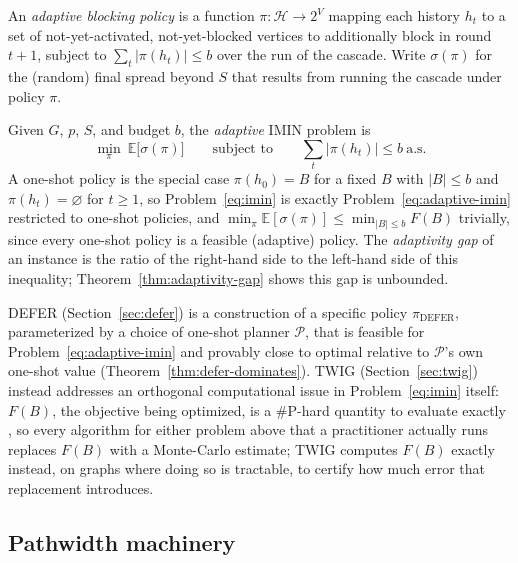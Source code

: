 \documentclass[ASNA,number]{USG}
\newcommand{\FF}{F}
\begin{document}
\begin{definition}\label{def:policy}
An \emph{adaptive blocking policy} is a function
$\pi:\mathcal H\to 2^V$ mapping each history $h_t$ to a set of
not-yet-activated, not-yet-blocked vertices to additionally block in round
$t+1$, subject to $\sum_{t}|\pi(h_t)|\le b$ over the run of the cascade.
Write $\sigma(\pi)$ for the (random) final spread beyond $S$ that results
from running the cascade under policy $\pi$.
\end{definition}

\begin{definition}\label{def:adaptive-imin}
Given $G$, $p$, $S$, and budget $b$, the \emph{adaptive} IMIN problem is
\begin{equation}\label{eq:adaptive-imin}
\min_{\pi}\ \mathbb E\bigl[\sigma(\pi)\bigr]
\qquad\text{subject to}\qquad
\textstyle\sum_t|\pi(h_t)|\le b\ \text{a.s.}
\end{equation}
A one-shot policy is the special case $\pi(h_0)=B$ for a fixed
$B$ with $|B|\le b$ and $\pi(h_t)=\varnothing$ for $t\ge1$, so
Problem~\eqref{eq:imin} is exactly Problem~\eqref{eq:adaptive-imin}
restricted to one-shot policies, and
$\min_\pi\mathbb E[\sigma(\pi)]\le\min_{|B|\le b}\FF(B)$ trivially, since
every one-shot policy is a feasible (adaptive) policy. The
\emph{adaptivity gap} of an instance is the ratio of the right-hand side to
the left-hand side of this inequality; Theorem~\ref{thm:adaptivity-gap}
shows this gap is unbounded.
\end{definition}

DEFER (Section~\ref{sec:defer}) is a construction of a specific policy
$\pi_{\mathrm{DEFER}}$, parameterized by a choice of one-shot planner
$\mathcal P$, that is feasible for Problem~\eqref{eq:adaptive-imin} and
provably close to optimal relative to $\mathcal P$'s own one-shot value
(Theorem~\ref{thm:defer-dominates}). TWIG (Section~\ref{sec:twig}) instead
addresses an orthogonal computational issue in Problem~\eqref{eq:imin}
itself: $\FF(B)$, the objective being optimized, is a \#P-hard quantity to
evaluate exactly \citep{valiant1979,provan1983}, so every algorithm for
either problem above that a practitioner actually runs replaces $\FF(B)$
with a Monte-Carlo estimate; TWIG computes $\FF(B)$ exactly instead, on
graphs where doing so is tractable, to certify how much error that
replacement introduces.

\subsection{Pathwidth machinery}\label{sec:treewidth-prelim}
\end{document}
